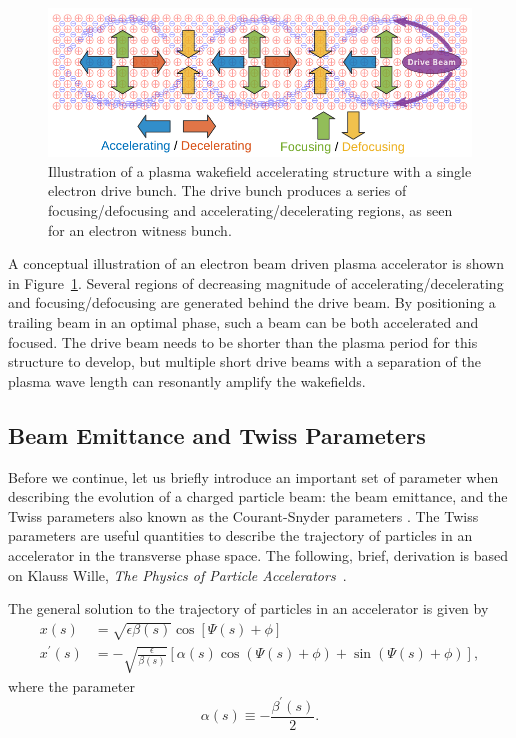 \begin{figure}[hbt]
    \centering
    \includegraphics[width=0.85\linewidth]{figures/PlasmaWakefield}
    \caption{\label{Fig:PWFA:Illust} Illustration of a plasma wakefield accelerating structure with a single electron drive bunch.
    The drive bunch produces a series of focusing\slash de\-fo\-cus\-ing and accelerating\slash de\-cel\-e\-rat\-ing regions, as seen for an electron witness bunch.}
\end{figure}

A conceptual illustration of an electron beam driven plasma accelerator is shown in Figure~\ref{Fig:PWFA:Illust}.
Several regions of decreasing magnitude of accelerating\slash decelerating and focusing\slash defocusing are generated behind the drive beam.
By positioning a trailing beam in an optimal phase, such a beam can be both accelerated and focused.
The drive beam needs to be shorter than the plasma period for this structure to develop, but multiple short drive beams with a separation of the plasma wave length can resonantly amplify the wakefields.

\subsection{Beam Emittance and Twiss Parameters}
\label{Int:BPI:EnTwiss}

Before we continue, let us briefly introduce an important set of parameter when describing the evolution of a charged particle beam: the beam emittance, and the Twiss parameters also known as the Courant-Snyder parameters \cite{courant:1958}.
The Twiss parameters are useful quantities to describe the trajectory of particles in an accelerator in the transverse phase space.
The following, brief, derivation is based on Klauss Wille, \textit{The Physics of Particle Accelerators}~\cite{wille:2001}.

The general solution to the trajectory of particles in an accelerator is given by
\begin{align}
    x(s)          &=  \sqrt{\epsilon\beta(s)} \cos\left[\Psi(s) + \phi\right] \label{EQ:PTrajX} \\
    x^{\prime}(s) &= -\sqrt{\frac{\epsilon}{\beta(s)}}
                     \left[\alpha(s)\cos\left(\Psi(s) + \phi\right) + \sin\left(\Psi(s) + \phi\right)\right], \label{EQ:PTrajXP}
\end{align}
where the parameter
\begin{equation}
    \alpha(s) \equiv -\frac{\beta^{\prime}(s)}{2}. \label{EQ:TwissAlpha}
\end{equation}

